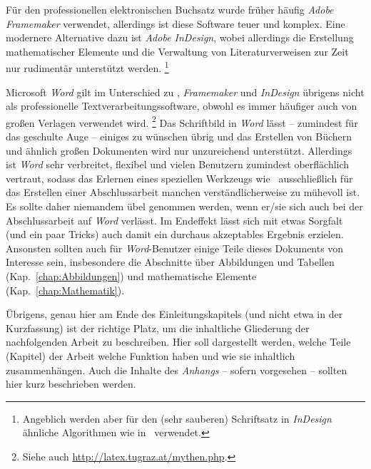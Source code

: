 Für den professionellen elektronischen Buchsatz wurde früher
häufig \emph{Adobe Framemaker} verwendet, allerdings ist diese
Software teuer und komplex. Eine modernere Alternative dazu ist
\emph{Adobe InDesign}, wobei allerdings die Erstellung
mathematischer Elemente und die Verwaltung von Literaturverweisen
zur Zeit nur rudimentär unterstützt werden.%
\footnote{Angeblich werden aber für den (sehr sauberen) Schriftsatz 
in \emph{InDesign} ähnliche Algorithmen wie in \latex\ verwendet.}

Microsoft \emph{Word} gilt im Unterschied zu \latex, 
\emph{Framemaker} und \emph{InDesign} übrigens nicht als professionelle
Textverarbeitungssoftware, obwohl es immer häufiger auch von
großen Verlagen verwendet wird.%
\footnote{Siehe auch \url{http://latex.tugraz.at/mythen.php}.}
Das Schriftbild in \emph{Word}
lässt -- zumindest für das geschulte Auge -- einiges zu wünschen
übrig und das Erstellen von Büchern und ähnlich großen Dokumenten
wird nur unzureichend unterstützt. Allerdings ist \emph{Word} sehr
verbreitet, flexibel und vielen Benutzern zumindest oberflächlich
vertraut, sodass das Erlernen eines speziellen Werkzeugs wie
\latex\ ausschließlich für das Erstellen einer Abschlussarbeit
manchen verständlicherweise zu mühevoll ist. Es sollte daher
niemandem übel genommen werden, wenn er/sie sich auch bei der Abschlussarbeit
auf \emph{Word} verlässt. Im Endeffekt lässt sich mit etwas
Sorgfalt (und ein paar Tricks) auch damit ein durchaus akzeptables
Ergebnis erzielen. 
Ansonsten sollten auch für \emph{Word}-Benutzer 
einige Teile dieses Dokuments von Interesse sein, insbesondere die
Abschnitte über Abbildungen und Tabellen
(Kap.~\ref{chap:Abbildungen}) und mathematische Elemente
(Kap.~\ref{chap:Mathematik}).

Übrigens, genau hier am Ende des Einleitungskapitels (und nicht
etwa in der Kurzfassung) ist der richtige Platz, um die
inhaltliche Gliederung der nachfolgenden Arbeit zu beschreiben.
Hier soll dargestellt werden, welche Teile (Kapitel) der Arbeit
welche Funktion haben und wie sie inhaltlich zusammenhängen. Auch
die Inhalte des \emph{Anhangs} -- sofern vorgesehen -- sollten hier
kurz beschrieben werden.

